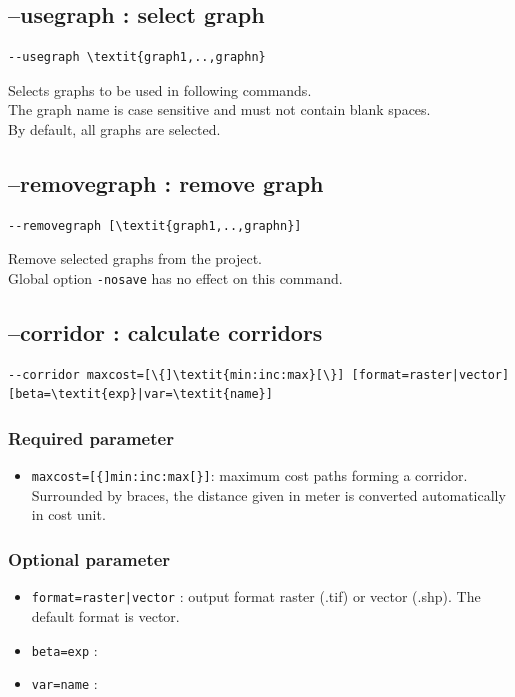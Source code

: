 \documentclass[a4paper,10pt]{report}
\begin{document}
\subsection{--usegraph : select graph}
\label{usegraph}
\begin{Verbatim}[commandchars=\\\{\}]
--usegraph \textit{graph1,..,graphn}
\end{Verbatim}
Selects graphs to be used in following commands.\\
The graph name is case sensitive and must not contain blank spaces.\\
By default, all graphs are selected.

\subsection{--removegraph : remove graph}
\begin{Verbatim}[commandchars=\\\{\}]
--removegraph [\textit{graph1,..,graphn}]
\end{Verbatim}
Remove selected graphs from the project.\\
Global option \verb|-nosave| has no effect on this command.


\subsection{--corridor : calculate corridors}
\begin{Verbatim}[commandchars=\\\{\}]
--corridor maxcost=[\{]\textit{min:inc:max}[\}] [format=raster|vector] [beta=\textit{exp}|var=\textit{name}]
\end{Verbatim}

\subsubsection{Required parameter}
\begin{itemize}
	\item \verb|maxcost=[{]min:inc:max[}]|: maximum cost paths forming a corridor. Surrounded by braces, the distance given in meter is converted automatically in cost unit.
\end{itemize}

\subsubsection{Optional parameter}
\begin{itemize}
	\item \verb+format=raster|vector+ : output format raster (.tif) or vector (.shp). The default format is vector.
	\item \verb|beta=exp| : 
	\item \verb|var=name| : 	
\end{itemize}
\end{document}
